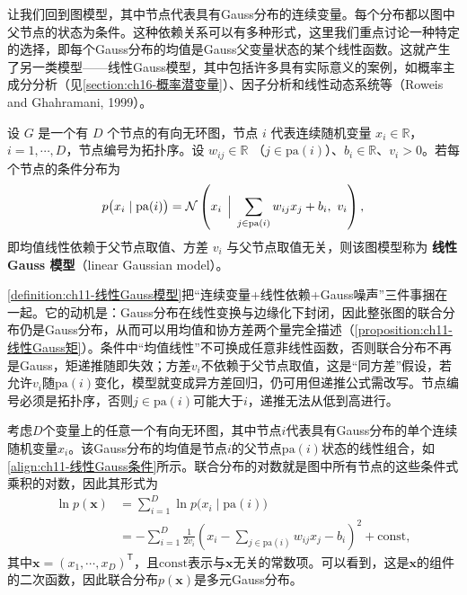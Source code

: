 \documentclass[../../main.tex]{subfiles}
\begin{document}
让我们回到图模型，其中节点代表具有Gauss分布的连续变量。每个分布都以图中父节点的状态为条件。这种依赖关系可以有多种形式，这里我们重点讨论一种特定的选择，即每个Gauss分布的均值是Gauss父变量状态的某个线性函数。这就产生了另一类模型——线性Gauss模型，其中包括许多具有实际意义的案例，如概率主成分分析（见\cref{section:ch16-概率潜变量}）、因子分析和线性动态系统等（Roweis and Ghahramani, 1999）。

\begin{definition}[线性 Gauss 模型]\label{definition:ch11-线性Gauss模型}
设 $G$ 是一个有 $D$ 个节点的有向无环图，节点 $i$ 代表连续随机变量
$x_i\in\mathbb{R}$，$i=1,\cdots,D$，节点编号为拓扑序。设 $w_{ij}\in\mathbb{R}$
（$j\in\mathrm{pa}(i)$）、$b_i\in\mathbb{R}$、$v_i>0$。若每个节点的条件分布为
\begin{align}
  p\bigl(x_i\mid \mathrm{pa}(i)\bigr) = \mathcal{N}\left(x_i\,\Bigm|\, \sum_{j\in \mathrm{pa}(i)}w_{ij}x_j+b_i,\ v_i\right),
  \label{align:ch11-线性Gauss条件}
\end{align}
即均值线性依赖于父节点取值、方差 $v_i$ 与父节点取值无关，则该图模型称为
\textbf{线性 Gauss 模型}（linear Gaussian model）。
\end{definition}

\begin{remark}
\cref{definition:ch11-线性Gauss模型}把“连续变量+线性依赖+Gauss噪声”三件事捆在一起。它的动机是：Gauss分布在线性变换与边缘化下封闭，因此整张图的联合分布仍是Gauss分布，从而可以用均值和协方差两个量完全描述（\cref{proposition:ch11-线性Gauss矩}）。条件中“均值线性”不可换成任意非线性函数，否则联合分布不再是Gauss，矩递推随即失效；方差$v_i$不依赖于父节点取值，这是“同方差”假设，若允许$v_i$随$\mathrm{pa}(i)$变化，模型就变成异方差回归，仍可用但递推公式需改写。节点编号必须是拓扑序，否则$j\in\mathrm{pa}(i)$可能大于$i$，递推无法从低到高进行。
\end{remark}

考虑$D$个变量上的任意一个有向无环图，其中节点$i$代表具有Gauss分布的单个连续随机变量$x_i$。该Gauss分布的均值是节点$i$的父节点$\mathrm{pa}(i)$状态的线性组合，如\eqref{align:ch11-线性Gauss条件}所示。联合分布的对数就是图中所有节点的这些条件式乘积的对数，因此其形式为
\begin{align}
  \ln p(\mathbf{x}) &= \sum_{i=1}^{D}\ln p\bigl(x_i\mid \mathrm{pa}(i)\bigr)\nonumber\\
  &= -\sum_{i=1}^{D}\frac{1}{2v_i}\left(x_i-\sum_{j\in\mathrm{pa}(i)}w_{ij}x_j-b_i\right)^{2}+\mathrm{const},
  \label{align:ch11-线性Gauss对数}
\end{align}
其中$\mathbf{x}=(x_1,\cdots,x_D)^{\mathsf{T}}$，且$\mathrm{const}$表示与$\mathbf{x}$无关的常数项。可以看到，这是$\mathbf{x}$的组件的二次函数，因此联合分布$p(\mathbf{x})$是多元Gauss分布。
\end{document}
